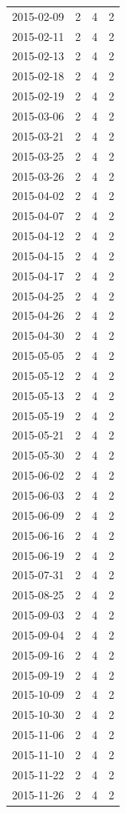 \begin{tabular}{lrrr}
2015-02-09 & 2 & 4 & 2 \\
2015-02-11 & 2 & 4 & 2 \\
2015-02-13 & 2 & 4 & 2 \\
2015-02-18 & 2 & 4 & 2 \\
2015-02-19 & 2 & 4 & 2 \\
2015-03-06 & 2 & 4 & 2 \\
2015-03-21 & 2 & 4 & 2 \\
2015-03-25 & 2 & 4 & 2 \\
2015-03-26 & 2 & 4 & 2 \\
2015-04-02 & 2 & 4 & 2 \\
2015-04-07 & 2 & 4 & 2 \\
2015-04-12 & 2 & 4 & 2 \\
2015-04-15 & 2 & 4 & 2 \\
2015-04-17 & 2 & 4 & 2 \\
2015-04-25 & 2 & 4 & 2 \\
2015-04-26 & 2 & 4 & 2 \\
2015-04-30 & 2 & 4 & 2 \\
2015-05-05 & 2 & 4 & 2 \\
2015-05-12 & 2 & 4 & 2 \\
2015-05-13 & 2 & 4 & 2 \\
2015-05-19 & 2 & 4 & 2 \\
2015-05-21 & 2 & 4 & 2 \\
2015-05-30 & 2 & 4 & 2 \\
2015-06-02 & 2 & 4 & 2 \\
2015-06-03 & 2 & 4 & 2 \\
2015-06-09 & 2 & 4 & 2 \\
2015-06-16 & 2 & 4 & 2 \\
2015-06-19 & 2 & 4 & 2 \\
2015-07-31 & 2 & 4 & 2 \\
2015-08-25 & 2 & 4 & 2 \\
2015-09-03 & 2 & 4 & 2 \\
2015-09-04 & 2 & 4 & 2 \\
2015-09-16 & 2 & 4 & 2 \\
2015-09-19 & 2 & 4 & 2 \\
2015-10-09 & 2 & 4 & 2 \\
2015-10-30 & 2 & 4 & 2 \\
2015-11-06 & 2 & 4 & 2 \\
2015-11-10 & 2 & 4 & 2 \\
2015-11-22 & 2 & 4 & 2 \\
2015-11-26 & 2 & 4 & 2 \\

\end{tabular}

